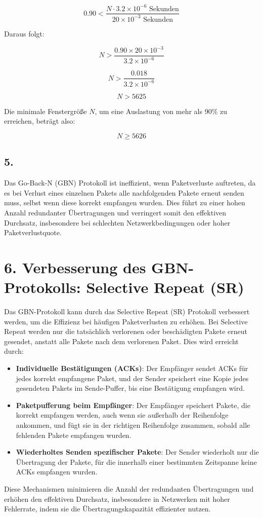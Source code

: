 \documentclass[a4paper]{scrartcl}
\begin{document}
\[
0.90 < \frac{N \cdot 3.2 \times 10^{-6} \text{ Sekunden}}{20 \times 10^{-3} \text{ Sekunden}}
\]

Daraus folgt:

\[
N > \frac{0.90 \times 20 \times 10^{-3}}{3.2 \times 10^{-6}}
\]

\[
N > \frac{0.018}{3.2 \times 10^{-6}}
\]

\[
N > 5625
\]

Die minimale Fenstergröße \( N \), um eine Auslastung von mehr als 90\% zu erreichen, beträgt also:

\[
N \geq 5626
\]

\subsection*{5.}

Das Go-Back-N (GBN) Protokoll ist ineffizient, wenn Paketverluste auftreten, da es bei Verlust eines einzelnen Pakets alle nachfolgenden Pakete erneut senden muss, selbst wenn diese korrekt empfangen wurden. Dies führt zu einer hohen Anzahl redundanter Übertragungen und verringert somit den effektiven Durchsatz, insbesondere bei schlechten Netzwerkbedingungen oder hoher Paketverlustquote.

\section*{6. Verbesserung des GBN-Protokolls: Selective Repeat (SR)}

Das GBN-Protokoll kann durch das Selective Repeat (SR) Protokoll verbessert werden, um die Effizienz bei häufigen Paketverlusten zu erhöhen. Bei Selective Repeat werden nur die tatsächlich verlorenen oder beschädigten Pakete erneut gesendet, anstatt alle Pakete nach dem verlorenen Paket. Dies wird erreicht durch:

\begin{itemize}
    \item \textbf{Individuelle Bestätigungen (ACKs)}: Der Empfänger sendet ACKs für jedes korrekt empfangene Paket, und der Sender speichert eine Kopie jedes gesendeten Pakets im Sende-Puffer, bis eine Bestätigung empfangen wird.
    \item \textbf{Paketpufferung beim Empfänger}: Der Empfänger speichert Pakete, die korrekt empfangen werden, auch wenn sie außerhalb der Reihenfolge ankommen, und fügt sie in der richtigen Reihenfolge zusammen, sobald alle fehlenden Pakete empfangen wurden.
    \item \textbf{Wiederholtes Senden spezifischer Pakete}: Der Sender wiederholt nur die Übertragung der Pakete, für die innerhalb einer bestimmten Zeitspanne keine ACKs empfangen wurden.
\end{itemize}

Diese Mechanismen minimieren die Anzahl der redundanten Übertragungen und erhöhen den effektiven Durchsatz, insbesondere in Netzwerken mit hoher Fehlerrate, indem sie die Übertragungskapazität effizienter nutzen.
\end{document}

